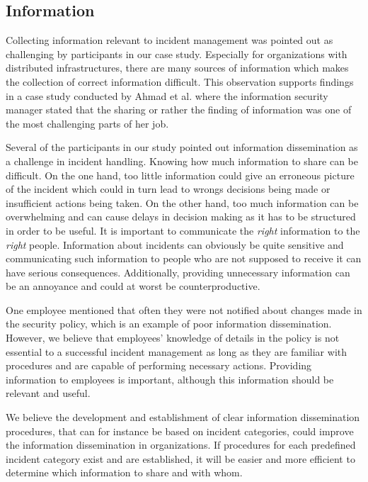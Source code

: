 \subsection{Information}
Collecting information relevant to incident management was pointed out as challenging by participants in our case study. Especially for organizations with distributed infrastructures, there are many sources of information which makes the collection of correct information difficult. This observation supports findings in a case study conducted by Ahmad et al.\cite{ahmad2012incident} where the information security manager stated that the sharing or rather the finding of information was one of the most challenging parts of her job. 

Several of the participants in our study pointed out information dissemination as a challenge in incident handling. Knowing how much information to share can be difficult. On the one hand, too little information could give an erroneous picture of the incident which could in turn lead to wrongs decisions being made or insufficient actions being taken. On the other hand, too much information can be overwhelming and can cause delays in decision making as it has to be structured in order to be useful. It is important to communicate the \textit{right} information to the \textit{right} people. Information about incidents can obviously be quite sensitive and communicating such information to people who are not supposed to receive it can have serious consequences. Additionally, providing unnecessary information can be an annoyance and could at worst be counterproductive.

One employee mentioned that often they were not notified about changes made in the security policy, which is an example of poor information dissemination. However, we believe that employees' knowledge of details in the policy is not essential to a successful incident management as long as they are familiar with procedures and are capable of performing necessary actions. Providing information to employees is important, although this information should be relevant and useful.

We believe the development and establishment of clear information dissemination procedures, that can for instance be based on incident categories, could improve the information dissemination in organizations. If procedures for each predefined incident category exist and are established, it will be easier and more efficient to determine which information to share and with whom.

